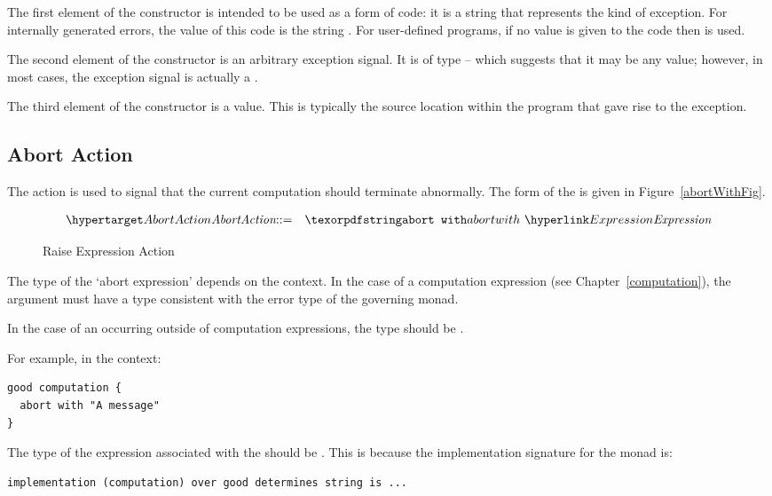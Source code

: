 The first element of the  constructor is intended to be used as a form of code: it is a string that represents the kind of exception. For internally generated errors, the value of this code is the string . For user-defined programs, if no value is given to the code then  is used.

The second element of the  constructor is an arbitrary exception signal. It is of type  -- which suggests that it may be any value; however, in most cases, the exception signal is actually a .

The third element of the  constructor is a  value. This is typically the source location within the program that gave rise to the exception.

\subsection{Abort Action}
\label{raiseAction}
The  action is used to signal that the current computation should terminate abnormally. The form of the  is given in Figure~\vref{abortWithFig}.


\begin{figure}[htbp]
\begin{eqnarray*}
\ntDef{AbortAction}&\arrow&\q{abort with}\ \ntRef{Expression}\\
\end{eqnarray*}
\caption{Raise Expression Action}
\label{abortWithFig}
\end{figure}

The type of the `abort expression' depends on the context. In the case of a computation expression (see Chapter~\vref{computation}), the argument must have a type consistent with the error type of the governing monad.

In the case of an  occurring outside of computation expressions, the type should be .

For example, in the context:
\begin{lstlisting}
good computation {
  abort with "A message"
}
\end{lstlisting}
The type of the expression associated with the  should be . This is because the implementation signature for the  monad is:

\begin{lstlisting}
implementation (computation) over good determines string is ...
\end{lstlisting}

